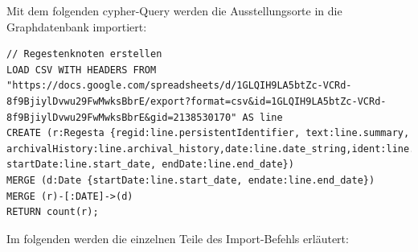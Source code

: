 \documentclass[ngerman,]{scrreprt}
\begin{document}
Mit dem folgenden cypher-Query werden die Ausstellungsorte in die Graphdatenbank importiert:

\begin{verbatim}
// Regestenknoten erstellen
LOAD CSV WITH HEADERS FROM "https://docs.google.com/spreadsheets/d/1GLQIH9LA5btZc-VCRd-8f9BjiylDvwu29FwMwksBbrE/export?format=csv&id=1GLQIH9LA5btZc-VCRd-8f9BjiylDvwu29FwMwksBbrE&gid=2138530170" AS line
CREATE (r:Regesta {regid:line.persistentIdentifier, text:line.summary, archivalHistory:line.archival_history,date:line.date_string,ident:line.identifier,regnum:line.regnum,origPlaceOfIssue:line.locality_string, startDate:line.start_date, endDate:line.end_date})
MERGE (d:Date {startDate:line.start_date, endate:line.end_date})
MERGE (r)-[:DATE]->(d)  
RETURN count(r);
\end{verbatim}

Im folgenden werden die einzelnen Teile des Import-Befehls erläutert:
\end{document}
